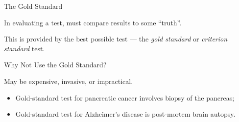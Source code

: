 \begin{frame}{The Gold Standard}

In evaluating a test, must compare results to some ``truth''.

This is provided by the best possible test --- the \emph{gold standard} or \emph{criterion standard} test.

\medskip

	\begin{block}{Why Not Use the Gold Standard?}

		 May be expensive, invasive, or impractical.

		\begin{itemize}

			\item{Gold-standard test for pancreatic cancer involves biopsy of the pancreas;}
			\item{Gold-standard test for Alzheimer's disease is post-mortem brain autopsy.}

		\end{itemize}

	\end{block}

\end{frame}



